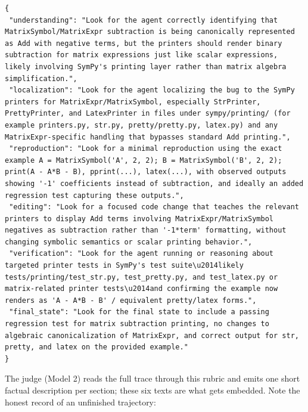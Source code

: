 \documentclass[10pt,twocolumn]{article}
\begin{document}
\begin{lstlisting}
{
 "understanding": "Look for the agent correctly identifying that MatrixSymbol/MatrixExpr subtraction is being canonically represented as Add with negative terms, but the printers should render binary subtraction for matrix expressions just like scalar expressions, likely involving SymPy's printing layer rather than matrix algebra simplification.",
 "localization": "Look for the agent localizing the bug to the SymPy printers for MatrixExpr/MatrixSymbol, especially StrPrinter, PrettyPrinter, and LatexPrinter in files under sympy/printing/ (for example printers.py, str.py, pretty/pretty.py, latex.py) and any MatrixExpr-specific handling that bypasses standard Add printing.",
 "reproduction": "Look for a minimal reproduction using the exact example A = MatrixSymbol('A', 2, 2); B = MatrixSymbol('B', 2, 2); print(A - A*B - B), pprint(...), latex(...), with observed outputs showing '-1' coefficients instead of subtraction, and ideally an added regression test capturing these outputs.",
 "editing": "Look for a focused code change that teaches the relevant printers to display Add terms involving MatrixExpr/MatrixSymbol negatives as subtraction rather than '-1*term' formatting, without changing symbolic semantics or scalar printing behavior.",
 "verification": "Look for the agent running or reasoning about targeted printer tests in SymPy's test suite\u2014likely tests/printing/test_str.py, test_pretty.py, and test_latex.py or matrix-related printer tests\u2014and confirming the example now renders as 'A - A*B - B' / equivalent pretty/latex forms.",
 "final_state": "Look for the final state to include a passing regression test for matrix subtraction printing, no changes to algebraic canonicalization of MatrixExpr, and correct output for str, pretty, and latex on the provided example."
}
\end{lstlisting}

\noindent The judge (Model 2) reads the full trace through this rubric and
emits one short factual description per section; these six texts are what
gets embedded. Note the honest record of an unfinished trajectory:
\end{document}

